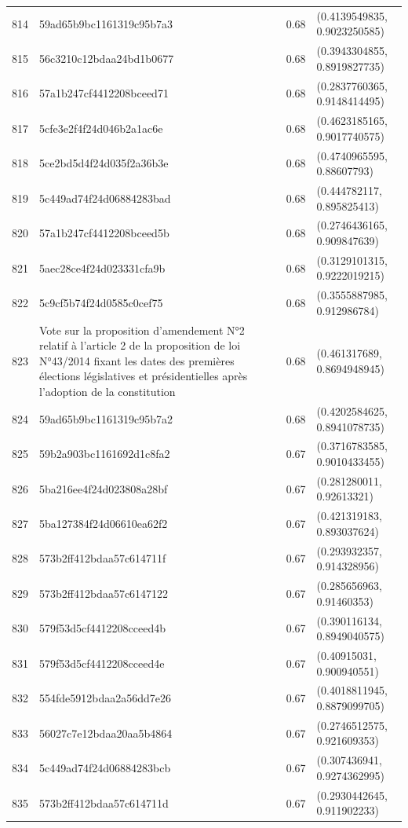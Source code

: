 \begin{table}[ht]
\begin{tabular}{rlrl}
  814 & 59ad65b9bc1161319c95b7a3 & 0.68 & (0.4139549835, 0.9023250585) \\ 
  815 & 56c3210c12bdaa24bd1b0677 & 0.68 & (0.3943304855, 0.8919827735) \\ 
  816 & 57a1b247cf4412208bceed71 & 0.68 & (0.2837760365, 0.9148414495) \\ 
  817 & 5cfe3e2f4f24d046b2a1ac6e & 0.68 & (0.4623185165, 0.9017740575) \\ 
  818 & 5ce2bd5d4f24d035f2a36b3e & 0.68 & (0.4740965595, 0.88607793) \\ 
  819 & 5c449ad74f24d06884283bad & 0.68 & (0.444782117, 0.895825413) \\ 
  820 & 57a1b247cf4412208bceed5b & 0.68 & (0.2746436165, 0.909847639) \\ 
  821 & 5aec28ce4f24d023331cfa9b & 0.68 & (0.3129101315, 0.9222019215) \\ 
  822 & 5c9cf5b74f24d0585c0cef75 & 0.68 & (0.3555887985, 0.912986784) \\ 
  823 & Vote sur la proposition d'amendement N°2 relatif à l'article 2 de la proposition de loi N°43/2014 fixant les dates des premières élections législatives et présidentielles après l'adoption de la constitution & 0.68 & (0.461317689, 0.8694948945) \\ 
  824 & 59ad65b9bc1161319c95b7a2 & 0.68 & (0.4202584625, 0.8941078735) \\ 
  825 & 59b2a903bc1161692d1c8fa2 & 0.67 & (0.3716783585, 0.9010433455) \\ 
  826 & 5ba216ee4f24d023808a28bf & 0.67 & (0.281280011, 0.92613321) \\ 
  827 & 5ba127384f24d06610ea62f2 & 0.67 & (0.421319183, 0.893037624) \\ 
  828 & 573b2ff412bdaa57c614711f & 0.67 & (0.293932357, 0.914328956) \\ 
  829 & 573b2ff412bdaa57c6147122 & 0.67 & (0.285656963, 0.91460353) \\ 
  830 & 579f53d5cf4412208cceed4b & 0.67 & (0.390116134, 0.8949040575) \\ 
  831 & 579f53d5cf4412208cceed4e & 0.67 & (0.40915031, 0.900940551) \\ 
  832 & 554fde5912bdaa2a56dd7e26 & 0.67 & (0.4018811945, 0.8879099705) \\ 
  833 & 56027c7e12bdaa20aa5b4864 & 0.67 & (0.2746512575, 0.921609353) \\ 
  834 & 5c449ad74f24d06884283bcb & 0.67 & (0.307436941, 0.9274362995) \\ 
  835 & 573b2ff412bdaa57c614711d & 0.67 & (0.2930442645, 0.911902233) \\ 

\end{tabular}
\end{table}
